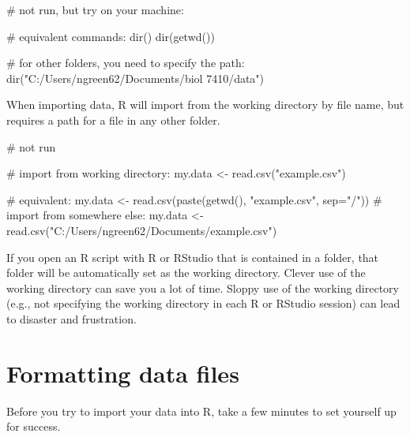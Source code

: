 \documentclass[
  13,
  letterpaper,
]{report}
\newenvironment{Shaded}{\begin{snugshade}}{\end{snugshade}}
\newcommand{\AttributeTok}[1]{\textcolor[rgb]{0.40,0.45,0.13}{#1}}
\newcommand{\CommentTok}[1]{\textcolor[rgb]{0.37,0.37,0.37}{#1}}
\newcommand{\FunctionTok}[1]{\textcolor[rgb]{0.28,0.35,0.67}{#1}}
\newcommand{\NormalTok}[1]{\textcolor[rgb]{0.00,0.23,0.31}{#1}}
\newcommand{\OtherTok}[1]{\textcolor[rgb]{0.00,0.23,0.31}{#1}}
\newcommand{\StringTok}[1]{\textcolor[rgb]{0.13,0.47,0.30}{#1}}
\begin{document}
\begin{Shaded}
\begin{Highlighting}[]
\CommentTok{\# not run, but try on your machine:}

\CommentTok{\# equivalent commands:}
\FunctionTok{dir}\NormalTok{()}
\FunctionTok{dir}\NormalTok{(}\FunctionTok{getwd}\NormalTok{())}

\CommentTok{\# for other folders, you need to specify the path:}
\FunctionTok{dir}\NormalTok{(}\StringTok{"C:/Users/ngreen62/Documents/biol 7410/data"}\NormalTok{)}
\end{Highlighting}
\end{Shaded}

When importing data, R will import from the working directory by file
name, but requires a path for a file in any other folder.

\begin{Shaded}
\begin{Highlighting}[]
\CommentTok{\# not run}

\CommentTok{\# import from working directory:}
\NormalTok{my.data }\OtherTok{\textless{}{-}} \FunctionTok{read.csv}\NormalTok{(}\StringTok{"example.csv"}\NormalTok{)}

\CommentTok{\# equivalent: }
\NormalTok{my.data }\OtherTok{\textless{}{-}} \FunctionTok{read.csv}\NormalTok{(}\FunctionTok{paste}\NormalTok{(}\FunctionTok{getwd}\NormalTok{(), }\StringTok{"example.csv"}\NormalTok{, }\AttributeTok{sep=}\StringTok{"/"}\NormalTok{))}
\CommentTok{\# import from somewhere else:}
\NormalTok{my.data }\OtherTok{\textless{}{-}} \FunctionTok{read.csv}\NormalTok{(}\StringTok{"C:/Users/ngreen62/Documents/example.csv"}\NormalTok{)}
\end{Highlighting}
\end{Shaded}

If you open an R script with R or RStudio that is contained in a folder,
that folder will be automatically set as the working directory. Clever
use of the working directory can save you a lot of time. Sloppy use of
the working directory (e.g., not specifying the working directory in
each R or RStudio session) can lead to disaster and frustration.

\section{Formatting data files}\label{sec-04-format}

Before you try to import your data into R, take a few minutes to set
yourself up for success.
\end{document}
